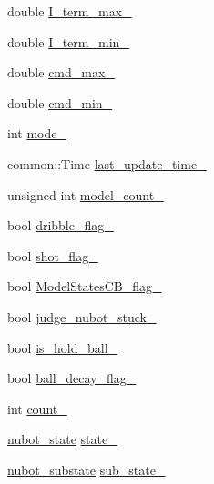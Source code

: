 \begin{DoxyCompactItemize}
\item 
double \hyperlink{classgazebo_1_1NubotGazebo_a0f8a50e34877912a0c53c3185ccd28d9}{I\-\_\-term\-\_\-max\-\_\-}
\item 
double \hyperlink{classgazebo_1_1NubotGazebo_affe0d982594c738a7ebec3ac1849c01f}{I\-\_\-term\-\_\-min\-\_\-}
\item 
double \hyperlink{classgazebo_1_1NubotGazebo_a6b6ab10ac24ec1483797885f5d1b9110}{cmd\-\_\-max\-\_\-}
\item 
double \hyperlink{classgazebo_1_1NubotGazebo_a360cbab192432814122197f21d685e56}{cmd\-\_\-min\-\_\-}
\item 
int \hyperlink{classgazebo_1_1NubotGazebo_a3c54a29f7aa4e67e4f86b5e848a930d5}{mode\-\_\-}
\item 
common\-::\-Time \hyperlink{classgazebo_1_1NubotGazebo_a1aeb8fee9f7e057b182afcf2fd03f1c1}{last\-\_\-update\-\_\-time\-\_\-}
\item 
unsigned int \hyperlink{classgazebo_1_1NubotGazebo_aefc2d91922066c5ffc1d7faa175ab68a}{model\-\_\-count\-\_\-}
\item 
bool \hyperlink{classgazebo_1_1NubotGazebo_a408738f621515f00547b54ed74481127}{dribble\-\_\-flag\-\_\-}
\item 
bool \hyperlink{classgazebo_1_1NubotGazebo_a85d5357dfacc73801bed752d6dc297d4}{shot\-\_\-flag\-\_\-}
\item 
bool \hyperlink{classgazebo_1_1NubotGazebo_ae7c8ddd9342426222c1354740b23a01d}{Model\-States\-C\-B\-\_\-flag\-\_\-}
\item 
bool \hyperlink{classgazebo_1_1NubotGazebo_a6392423c1aaf2ba68aac9eeb318f9e5b}{judge\-\_\-nubot\-\_\-stuck\-\_\-}
\item 
bool \hyperlink{classgazebo_1_1NubotGazebo_a0d63b5e7f3d213fca30bbe09bd15e114}{is\-\_\-hold\-\_\-ball\-\_\-}
\item 
bool \hyperlink{classgazebo_1_1NubotGazebo_a51c8eaa9e931b22700f6c000e413bfa2}{ball\-\_\-decay\-\_\-flag\-\_\-}
\item 
int \hyperlink{classgazebo_1_1NubotGazebo_afbdb7428487c2f6dec5000bae3d6f5a7}{count\-\_\-}
\item 
\hyperlink{nubot__gazebo_8hh_a9f17572284bab3e9bd067a6393a7953b}{nubot\-\_\-state} \hyperlink{classgazebo_1_1NubotGazebo_acf9828d7b8b37440a8e45ef63895ec8b}{state\-\_\-}
\item 
\hyperlink{nubot__gazebo_8hh_a503a2f01f9f49bd293d3c44faf21b528}{nubot\-\_\-substate} \hyperlink{classgazebo_1_1NubotGazebo_a8db3f4b9767b4ec34716756f02fb7fe9}{sub\-\_\-state\-\_\-}
\item 

\end{DoxyCompactItemize}
